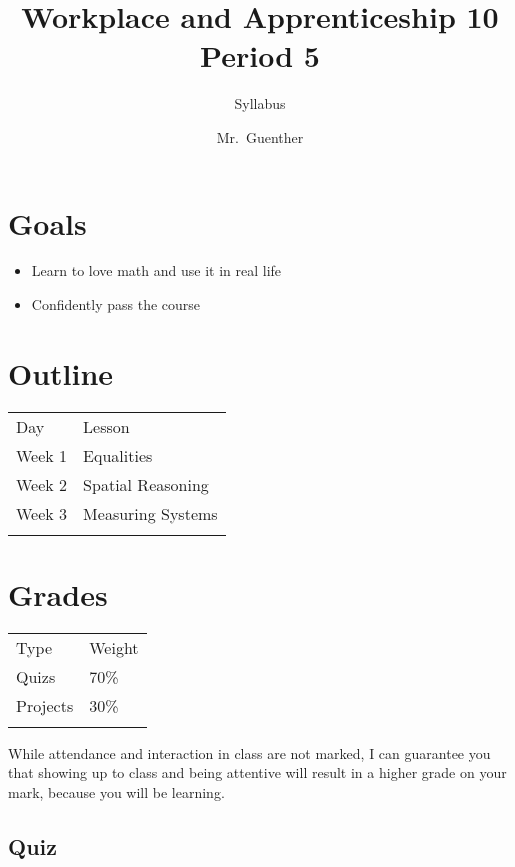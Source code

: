 \documentclass[]{article}
\title{Workplace and Apprenticeship 10 Period 5}
\author{Syllabus}
\date{Mr.~Guenther}
\begin{document}
\maketitle

\section{Goals}\label{goals}

\begin{itemize}
\itemsep1pt\parskip0pt
\item
  Learn to love math and use it in real life
\item
  Confidently pass the course
\end{itemize}

\section{Outline}\label{outline}

\begin{longtable}[c]{@{}ll@{}}
\toprule\addlinespace
Day & Lesson
\\\addlinespace
\midrule\endhead
Week 1 & Equalities
\\\addlinespace
Week 2 & Spatial Reasoning
\\\addlinespace
Week 3 & Measuring Systems
\\\addlinespace
\bottomrule
\end{longtable}

\section{Grades}\label{grades}

\begin{longtable}[c]{@{}ll@{}}
\toprule\addlinespace
Type & Weight
\\\addlinespace
\midrule\endhead
Quizs & 70\%
\\\addlinespace
Projects & 30\%
\\\addlinespace
\bottomrule
\end{longtable}

While attendance and interaction in class are not marked, I can
guarantee you that showing up to class and being attentive will result
in a higher grade on your mark, because you will be learning.

\subsection{Quiz}\label{quiz}
\end{document}
